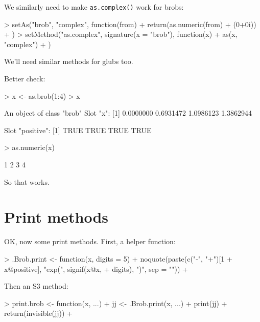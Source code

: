 \documentclass[a4paper]{article}
\begin{document}
We similarly need to make {\tt as.complex()} work for brobs:
\begin{Schunk}
\begin{Sinput}
> setAs("brob", "complex", function(from) {
+     return(as.numeric(from) + (0+0i))
+ })
> setMethod("as.complex", signature(x = "brob"), function(x) {
+     as(x, "complex")
+ })
\end{Sinput}
\end{Schunk}

We'll need similar methods for glubs too.


Better check:



\begin{Schunk}
\begin{Sinput}
> x <- as.brob(1:4)
> x
\end{Sinput}
\begin{Soutput}
An object of class "brob"
Slot "x":
[1] 0.0000000 0.6931472 1.0986123 1.3862944

Slot "positive":
[1] TRUE TRUE TRUE TRUE
\end{Soutput}
\begin{Sinput}
> as.numeric(x)
\end{Sinput}
\begin{Soutput}
[1] 1 2 3 4
\end{Soutput}
\end{Schunk}

So that works.

\section{Print methods}
OK, now some print methods.  First, a helper function:


\begin{Schunk}
\begin{Sinput}
> .Brob.print <- function(x, digits = 5) {
+     noquote(paste(c("-", "+")[1 + x@positive], "exp(", signif(x@x, 
+         digits), ")", sep = ""))
+ }
\end{Sinput}
\end{Schunk}

Then an S3 method:

\begin{Schunk}
\begin{Sinput}
> print.brob <- function(x, ...) {
+     jj <- .Brob.print(x, ...)
+     print(jj)
+     return(invisible(jj))
+ }
\end{Sinput}
\end{Schunk}
\end{document}
